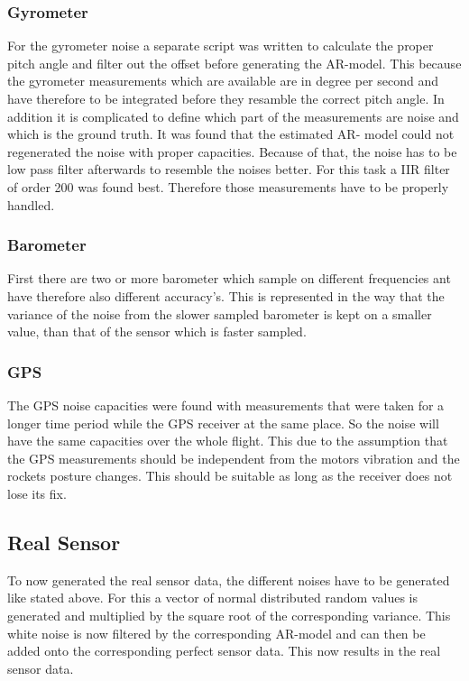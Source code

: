 \subsubsection{Gyrometer}
For the gyrometer noise a separate script was written to calculate the proper pitch angle and filter out the offset before generating the AR-model.
This because the gyrometer measurements which are available are in degree per second and have therefore to be integrated before they resamble the correct pitch angle.
In addition it is complicated to define which part of the measurements are noise and which is the ground truth.
It was found that the estimated AR- model could not regenerated the noise with proper capacities.
Because of that, the noise has to be low pass filter afterwards to resemble the noises better.
For this task a IIR filter of order 200 was found best.
Therefore those measurements have to be properly handled.

\subsubsection{Barometer}
First there are two or more barometer which sample on different frequencies ant have therefore also different accuracy's.
This is represented in the way that the variance of the noise from the slower sampled barometer is kept on a smaller value,
than that of the sensor which is faster sampled.

\subsubsection{GPS}
The GPS noise capacities were found with measurements that were taken for a longer time period while the GPS receiver at the same place.
So the noise will have the same capacities over the whole flight.
This due to the assumption that the GPS measurements should be independent from the motors vibration and the rockets posture changes.
This should be suitable as long as the receiver does not lose its fix.

\newpage
\subsection{Real Sensor}
To now generated the real sensor data, the different noises have to be generated like stated above.
For this a vector of normal distributed random values is generated and multiplied by the square root of the corresponding variance.
This white noise is now filtered by the corresponding AR-model and can then be added onto the corresponding perfect sensor data.
This now results in the real sensor data.

